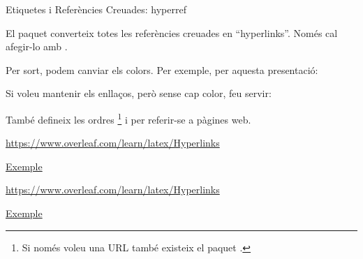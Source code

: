 \begin{frame}[fragile]{Etiquetes i Referències Creuades: hyperref}
\begin{itemize}{\small
\item El paquet  converteix totes les referències creuades en ``hyperlinks''. Només cal afegir-lo amb .
\item Per sort, podem canviar els colors. Per exemple, per aquesta presentació:
\begin{exampletiny}
\usepackage{hyperref}
\hypersetup{colorlinks,breaklinks,urlcolor=magenta,linkcolor=black}
\end{exampletiny}
\item Si voleu mantenir els enllaços, però sense cap color, feu servir:
\begin{exampletiny}
\hypersetup{hidelinks=true}
\end{exampletiny}

\item També defineix les ordres \footnote{Si només voleu una URL també existeix el paquet .}
    i  per referir-se a pàgines web.
}\end{itemize}
\begin{exampletiny}
\url{https://www.overleaf.com/learn/latex/Hyperlinks}

\href{https://www.overleaf.com/learn/latex/Hyperlinks}{Exemple}
\end{exampletiny}

\url{https://www.overleaf.com/learn/latex/Hyperlinks}

\href{https://www.overleaf.com/learn/latex/Hyperlinks}{Exemple}
\end{frame}


